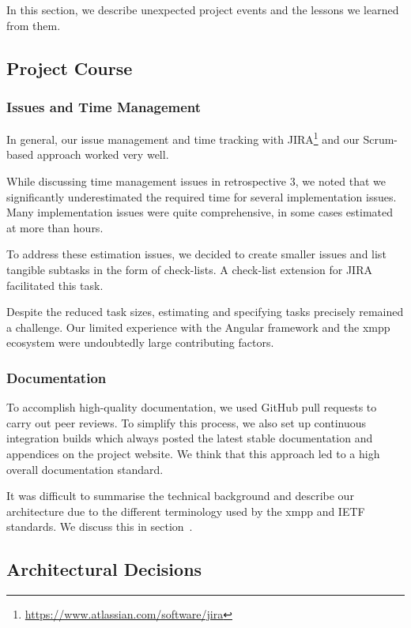 In this section, we describe unexpected project events and the lessons we learned from them.

\subsection{Project Course}

\subsubsection{Issues and Time Management}

In general, our issue management and time tracking with JIRA\footnote{\url{https://www.atlassian.com/software/jira}} and our Scrum-based approach worked very well.

While discussing time management issues in retrospective 3, we noted that we significantly underestimated the required time for several implementation issues.
Many implementation issues were quite comprehensive, in some cases estimated at more than hours.

To address these estimation issues, we decided to create smaller issues and list tangible subtasks in the form of check-lists.
A check-list extension for JIRA facilitated this task.

Despite the reduced task sizes, estimating and specifying tasks precisely remained a challenge.
Our limited experience with the Angular framework and the \gls{xmpp} ecosystem were undoubtedly large contributing factors.

\subsubsection{Documentation}

To accomplish high-quality documentation, we used GitHub pull requests to carry out peer reviews.
To simplify this process, we also set up continuous integration builds which always posted the latest stable documentation and appendices on the project website.
We think that this approach led to a high overall documentation standard.

It was difficult to summarise the technical background and describe our architecture due to the different terminology used by the \gls{xmpp} and IETF standards.
We discuss this in section~.

\subsection{Architectural Decisions}

